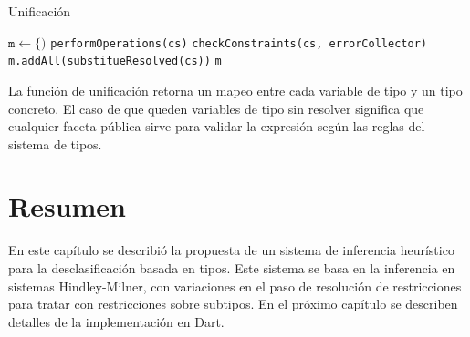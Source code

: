 \begin{algorithm}\captionsetup{labelsep=newline}
  \centering
  \caption{Unificación}
  \label{pseudouni}
    \begin{algorithmic}[1]
          \State $\mathtt{m\gets \{)}$
            \State \texttt{performOperations(cs)}
            \State \texttt{checkConstraints(cs, errorCollector)}
            \State \texttt{m.addAll(substitueResolved(cs))}
          \EndWhile
          \State \Return \texttt{m}
      \EndFunction
    \end{algorithmic}
\end{algorithm}
\clearpage
La función de unificación retorna un mapeo entre cada variable de tipo y un tipo concreto. El caso de que queden variables de tipo sin resolver significa que cualquier faceta pública sirve para validar la expresión según las reglas del sistema de tipos.

\section*{Resumen}
En este capítulo se describió la propuesta de un sistema de inferencia heurístico para la desclasificación basada en tipos. Este sistema se basa en la inferencia en sistemas Hindley-Milner, con variaciones en el paso de resolución de restricciones para tratar con restricciones sobre subtipos. En el próximo capítulo se describen detalles de la implementación en Dart.
